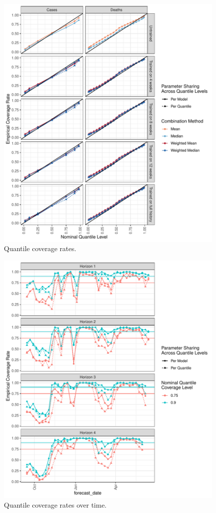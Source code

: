 \documentclass[review]{elsarticle}
\begin{document}
\begin{figure}
  \includegraphics[width=\textwidth]{figures/quantile_coverage_quantile_group.pdf}
  \caption{Quantile coverage rates.}
\end{figure}


\begin{figure}
  \includegraphics[width=\textwidth]{figures/quantile_coverage_quantile_group_by_date_Cases.pdf}
  \caption{Quantile coverage rates over time.}
\end{figure}
\end{document}
